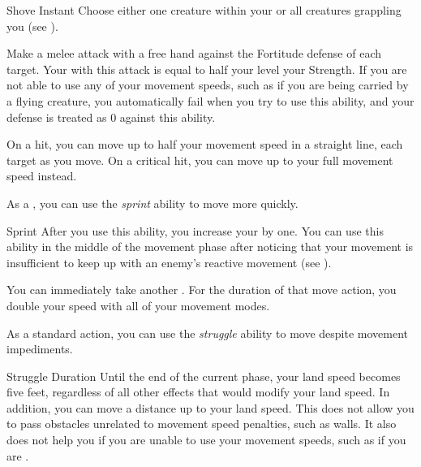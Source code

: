         \begin{instantability}{Shove}\label{Shove}
            Instant
            \rankline
            Choose either one creature within your  or all creatures grappling you (see ).

            Make a melee attack with a free hand against the Fortitude defense of each target.
            Your  with this attack is equal to half your level \add your Strength.
            If you are not able to use any of your movement speeds, such as if you are being carried by a flying creature, you automatically fail when you try to use this ability, and your defense is treated as 0 against this ability.

            On a hit, you can move up to half your movement speed in a straight line,  each target as you move.
            On a critical hit, you can move up to your full movement speed instead.
        \end{instantability}

         As a , you can use the \textit{sprint} ability to move more quickly.

        \begin{instantability}{Sprint}
            \label{Sprint}
            \rankline
            After you use this ability, you increase your  by one.
            You can use this ability in the middle of the movement phase after noticing that your movement is insufficient to keep up with an enemy's reactive movement (see ).

            You can immediately take another .
            For the duration of that move action, you double your speed with all of your movement modes.
        \end{instantability}

         As a standard action, you can use the \textit{struggle} ability to move despite movement impediments.

        \begin{durationability}{Struggle}
            \label{Struggle}
            Duration
            \rankline
            Until the end of the current phase, your land speed becomes five feet, regardless of all other effects that would modify your land speed.
            In addition, you can move a distance up to your land speed.
            This does not allow you to pass obstacles unrelated to movement speed penalties, such as walls.
            It also does not help you if you are unable to use your movement speeds, such as if you are \immobilized.
        \end{durationability}

